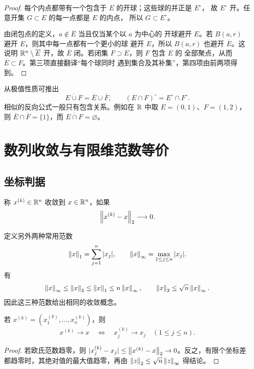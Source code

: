 \begin{proof}
每个内点都带有一个包含于 \(E\) 的开球；这些球的并正是 \(E^\circ\)，
故 \(E^\circ\) 开。任意开集 \(G\subset E\) 的每一点都是 \(E\) 的内点，
所以 \(G\subset E^\circ\)。

由闭包点的定义，\(a\notin\overline E\) 当且仅当某个以 \(a\) 为中心的
开球避开 \(E\)。若 \(B(a,r)\) 避开 \(E\)，则其中每一点都有一个更小的球
避开 \(E\)，所以 \(B(a,r)\) 也避开 \(\overline E\)。这说明
\(\mathbb{R}^n\setminus\overline E\) 开，故
\(\overline E\) 闭。若闭集 \(F\supset E\)，则 \(F\) 包含 \(E\) 的
全部聚点，从而 \(\overline E\subset F\)。第三项直接翻译“每个球同时
遇到集合及其补集”，第四项由前两项得到。
\end{proof}

从极值性质可推出
\[
 \overline{E\cup F}=\overline E\cup\overline F,
 \qquad
 (E\cap F)^\circ=E^\circ\cap F^\circ.
\]
相似的反向公式一般只有包含关系。例如在 \(\mathbb{R}\) 中取
\(E=(0,1)\)、\(F=(1,2)\)，则
\(\overline E\cap\overline F=\{1\}\)，而
\(\overline{E\cap F}=\varnothing\)。

\section{数列收敛与有限维范数等价}

\subsection{坐标判据}

\begin{definition}[欧氏空间中的数列收敛]
称 \(x^{(k)}\in\mathbb{R}^n\) 收敛到 \(x\in\mathbb{R}^n\)，如果
\[
 \left\lVert x^{(k)}-x\right\rVert_2\longrightarrow0.
\]
\end{definition}

定义另外两种常用范数
\[
 \left\lVert x\right\rVert_1=\sum_{j=1}^n|x_j|,
 \qquad
 \left\lVert x\right\rVert_\infty=\max_{1\le j\le n}|x_j|.
\]
有
\[
 \left\lVert x\right\rVert_\infty\le\left\lVert x\right\rVert_2
 \le\left\lVert x\right\rVert_1\le n\left\lVert x\right\rVert_\infty,
 \qquad
 \left\lVert x\right\rVert_2\le\sqrt n\left\lVert x\right\rVert_\infty.
\]
因此这三种范数给出相同的收敛概念。

\begin{theorem}[坐标收敛判据]
\label{thm:euclidean-coordinate-convergence}
若 \(x^{(k)}=(x^{(k)}_1,\ldots,x^{(k)}_n)\)，则
\[
 x^{(k)}\to x
 \quad\Longleftrightarrow\quad
 x^{(k)}_j\to x_j\quad(1\le j\le n).
\]
\end{theorem}

\begin{proof}
若欧氏范数趋零，则
\(|x_j^{(k)}-x_j|\le\left\lVert x^{(k)}-x\right\rVert_2\to0\)。反之，有限个坐标差
都趋零时，其绝对值的最大值趋零，再由
\(\left\lVert z\right\rVert_2\le\sqrt n\left\lVert z\right\rVert_\infty\) 得结论。
\end{proof}


